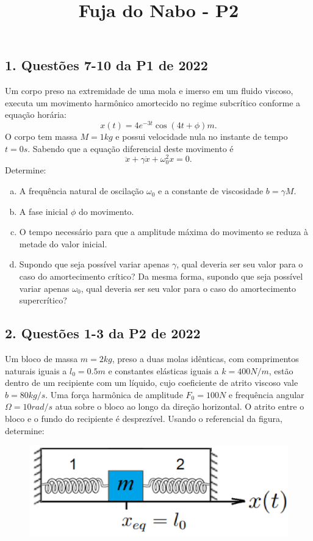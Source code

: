 \documentclass[a4paper,10pt]{article}
\title{\Huge{\textbf{Fuja do Nabo - P2}}}
\date{\vspace{-10ex}}
\begin{document}
\maketitle

\subsection*{1. Questões 7-10 da P1 de 2022}

Um corpo preso na extremidade de uma mola e imerso em um
fluido viscoso, executa um movimento harmônico amortecido no regime subcrítico conforme a equação
horária:
$$
x(t) = 4 e^{-3t} \cos(4t + \phi) \unit{m}.
$$
O corpo tem massa $M=1 \unit{kg}$ e possui velocidade nula no instante de tempo $t = 0 \unit{s}$. Sabendo que
a equação diferencial deste movimento é
$$
\ddot{x} + \gamma \dot{x} + \omega_0^2x = 0.
$$
Determine:

\begin{enumerate}[(a)]
\item A frequência natural de oscilação $\omega_0$ e a constante de viscosidade $b = \gamma M$.

\item A fase inicial $\phi$ do movimento.

\item O tempo necessário para que a amplitude máxima do movimento se reduza à metade do valor inicial.

\item Supondo que seja possível variar apenas $\gamma$, qual deveria ser seu valor para o caso
do amortecimento crítico? Da mesma forma, supondo que seja possível variar apenas $\omega_0$, qual
deveria ser seu valor para o caso do amortecimento supercrítico?
\end{enumerate}

\n\n\n

\subsection*{2. Questões 1-3 da P2 de 2022}

Um bloco de massa $m = 2 \unit{kg}$, preso a duas molas idênticas, com
comprimentos naturais iguais a $l_0 = 0.5 \unit{m}$ e constantes elásticas iguais a $k = 400 \unit{N/m}$, estão dentro
de um recipiente com um líquido, cujo coeficiente de atrito viscoso vale $b = 80 \unit{kg/s}$. Uma força
harmônica de amplitude $F_0 = 100 \unit{N}$ e frequência angular $\Omega = 10 \unit{rad/s}$ atua sobre o bloco ao
longo da direção horizontal. O atrito entre o bloco e o fundo do recipiente é desprezível. Usando o
referencial da figura, determine:
\begin{figure}[H]
\centering
\includegraphics[width=0.9\linewidth]{fig/duas_molas.png}
\label{fig:duas_molas}
\end{figure}
\end{document}

